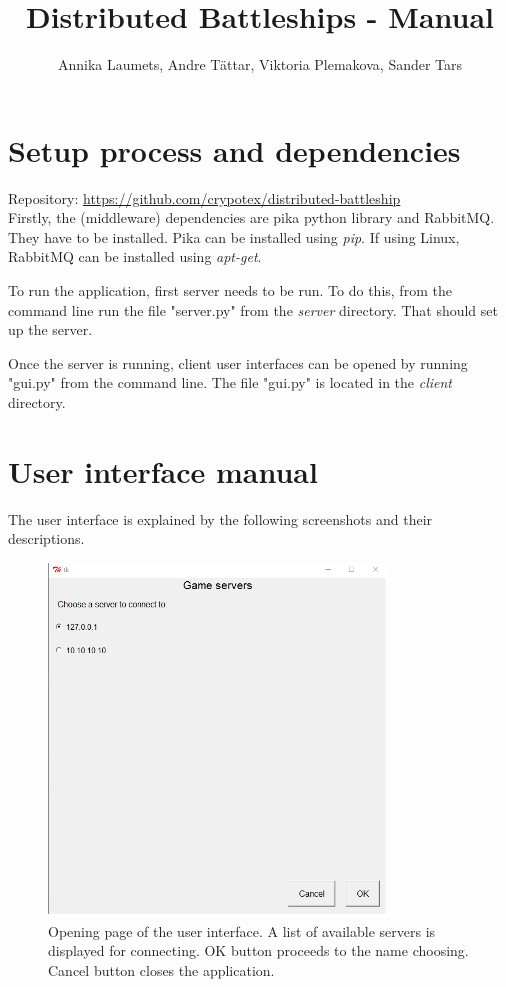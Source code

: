\documentclass[]{article}
\title{Distributed Battleships - Manual}
\author{Annika Laumets, Andre Tättar, Viktoria Plemakova, Sander Tars}
\begin{document}
\lstset{language=Python}  

\maketitle

\section*{Setup process and dependencies}

Repository: \url{https://github.com/crypotex/distributed-battleship}\\

Firstly, the (middleware) dependencies are pika python library and RabbitMQ. They have to be installed. Pika can be installed using \textit{pip}. If using Linux, RabbitMQ can be installed using \textit{apt-get}.

\noindent To run the application, first server needs to be run. To do this, from the command line run the file "server.py" from the \textit{server} directory. That should set up the server.

\noindent Once the server is running, client user interfaces can be opened by running "gui.py" from the command line. The file "gui.py" is located in the \textit{client} directory. 
\newpage

\section*{User interface manual}
The user interface is explained by the following screenshots and their descriptions.


\begin{figure}[!hbt]
	\centering
	\includegraphics[width=0.8\textwidth]{OpenPage.png}
	\caption{Opening page of the user interface. A list of available servers is displayed for connecting. OK button proceeds to the name choosing. Cancel button closes the application.}
	\label{fig:Openpage}
\end{figure}
\end{document}
